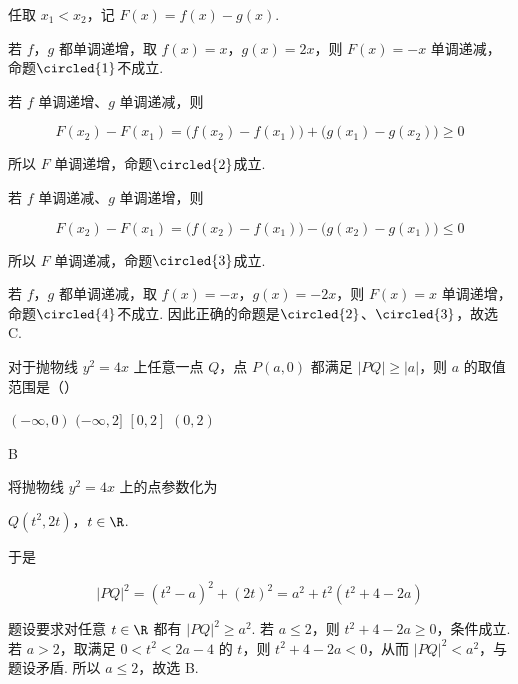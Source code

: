 \begin{solution}
任取 \(x_1<x_2\)，记 \(F(x)=f(x)-g(x)\).

若 \(f\)，\(g\) 都单调递增，取 \(f(x)=x\)，\(g(x)=2x\)，则 \(F(x)=-x\) 单调递减，命题\(\circled{1}\)不成立.

若 \(f\) 单调递增、\(g\) 单调递减，则

\[
F(x_2)-F(x_1)=\bigl(f(x_2)-f(x_1)\bigr)+\bigl(g(x_1)-g(x_2)\bigr)\geqslant0
\]

所以 \(F\) 单调递增，命题\(\circled{2}\)成立.

若 \(f\) 单调递减、\(g\) 单调递增，则

\[
F(x_2)-F(x_1)=\bigl(f(x_2)-f(x_1)\bigr)-\bigl(g(x_2)-g(x_1)\bigr)\leqslant0
\]

所以 \(F\) 单调递减，命题\(\circled{3}\)成立.

若 \(f\)，\(g\) 都单调递减，取 \(f(x)=-x\)，\(g(x)=-2x\)，则 \(F(x)=x\) 单调递增，命题\(\circled{4}\)不成立. 因此正确的命题是\(\circled{2}\)、\(\circled{3}\)，故选 C.
\end{solution}

\begin{problem}
对于抛物线 \(y^{2} = 4x\) 上任意一点 \(Q\)，点 \(P(a, 0)\) 都满足 \(|PQ| \geqslant |a|\)，则 \(a\) 的取值范围是（\quad）

\choices
    {\((-\infty, 0)\)}
    {\((-\infty, 2]\)}
    {\([0, 2]\)}
    {\((0, 2)\)}
\end{problem}

\begin{answer}
B
\end{answer}

\begin{solution}
将抛物线 \(y^2=4x\) 上的点参数化为

\(Q(t^2,2t)\)，\(t\in\R\).

于是

\[
|PQ|^2=(t^2-a)^2+(2t)^2=a^2+t^2\left(t^2+4-2a\right)
\]

题设要求对任意 \(t\in\R\) 都有 \(|PQ|^2\geqslant a^2\). 若 \(a\leqslant2\)，则 \(t^2+4-2a\geqslant0\)，条件成立. 若 \(a>2\)，取满足 \(0<t^2<2a-4\) 的 \(t\)，则 \(t^2+4-2a<0\)，从而 \(|PQ|^2<a^2\)，与题设矛盾. 所以 \(a\leqslant2\)，故选 B.
\end{solution}

